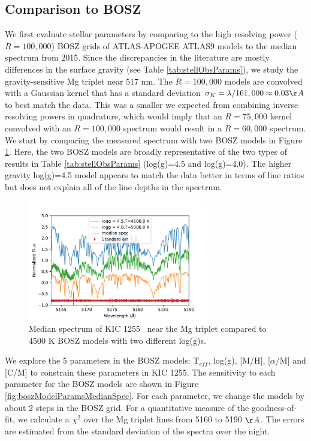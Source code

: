 \documentclass[preprint]{aastex61}
\newcommand{\shStar}{KIC 1255}
\begin{document}
\subsection{Comparison to BOSZ}
We first evaluate stellar parameters by comparing to the high resolving power ($R=100,000$) BOSZ grids of ATLAS-APOGEE ATLAS9 models \citep{bohlin2017bosz} to the median spectrum from 2015.
Since the discrepancies in the literature are mostly differences in the surface gravity (see Table \ref{tab:stellObsParams}), we study the gravity-sensitive Mg triplet near 517 nm.
The $R=100,000$ models are convolved with a Gaussian kernel that has a standard deviation $\sigma_K = \lambda/161,000 \approx 0.03 \AA$ to best match the data.
This was a smaller we expected from combining inverse resolving powers in quadrature, which would imply that an $R=75,000 $ kernel convolved with an $R=100,000$ spectrum would result in a $R=60,000$ spectrum.
We start by comparing the measured spectrum with two BOSZ models in Figure \ref{fig:mgTripletBOSZ}.
Here, the two BOSZ models are broadly representative of the two types of results in Table \ref{tab:stellObsParams} (log(g)=4.5 and log(g)=4.0).
The higher gravity log(g)=4.5 model appears to match the data better in terms of line ratios but does not explain all of the line depths in the spectrum.

\begin{figure}[!hbtp]
\begin{centering}
\includegraphics[width=0.7\textwidth]{images/subaru/bosz_mg_triplet_median_spec_w_5000.pdf}
\caption{Median spectrum of \shStar\ \citep{} near the Mg triplet compared to 4500 K BOSZ models with two different log(g)s.}\label{fig:mgTripletBOSZ}
\end{centering}
\end{figure}

We explore the 5 parameters in the BOSZ models: T$_{eff}$, log(g), [M/H], [$\alpha$/M] and [C/M] to constrain these parameters in \shStar.
The sensitivity to each parameter for the BOSZ models are shown in Figure \ref{fig:boszModelParamsMedianSpec}.
For each parameter, we change the models by about 2 steps in the BOSZ grid.
For a quantitative measure of the goodness-of-fit, we calculate a $\chi^2$ over the Mg triplet lines from 5160 to 5190 $\AA$.
The errors are estimated from the standard deviation of the spectra over the night.
\end{document}
